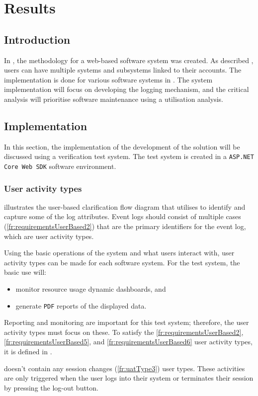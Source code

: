 \chapter{Results}
\label{chap:3}

\section{Introduction}
In , the methodology for a web-based software system was created. As described , users can have multiple systems and subsystems linked to their accounts. The implementation is done for various software systems in . The system implementation will focus on developing the logging mechanism, and the critical analysis will prioritise software maintenance using a utilisation analysis.

\section{Implementation}\label{sec:ch3_implementation}
In this section, the implementation of the development of the solution will be discussed using a verification test system. The test system is created in a \texttt{ASP.NET Core Web SDK} software environment.

\subsection{User activity types}
 illustrates the user-based clarification flow diagram that utilises  to identify and capture some of the log attributes. Event logs should consist of multiple cases (\ref{fr:requirementsUserBased2}) that are the primary identifiers for the event log, which are user activity types.\par Using the basic operations of the system and what users interact with, user activity types can be made for each software system. For the test system, the basic use will:

\begin{itemize}
	\item monitor resource usage dynamic dashboards, and
	\item generate \texttt{PDF} reports of the displayed data.
\end{itemize}

Reporting and monitoring are important for this test system; therefore, the user activity types must focus on these. To satisfy the \ref{fr:requirementsUserBased2}, \ref{fr:requirementsUserBased5}, and \ref{fr:requirementsUserBased6} user activity types, it is defined in . \par {} doesn't contain any session changes (\ref{fr:uatType3}) user types. These activities are only triggered when the user logs into their system or terminates their session by pressing the log-out button.

